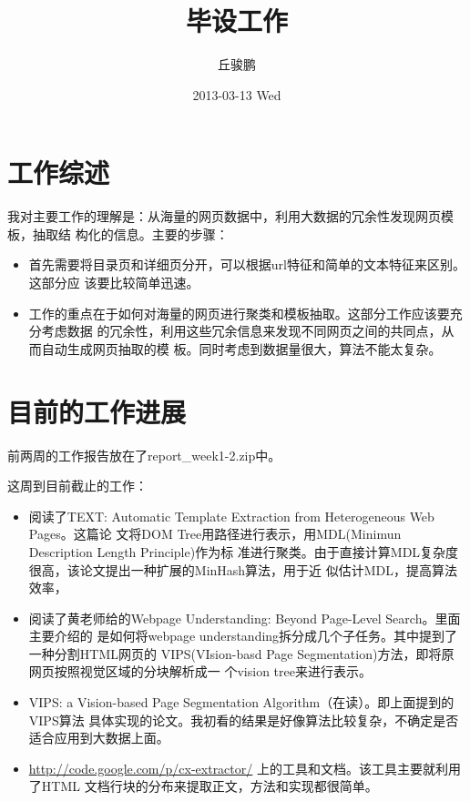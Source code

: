 \documentclass[a4paper]{article}
\title{毕设工作}
\author{丘骏鹏}
\date{2013-03-13 Wed}
\begin{document}
\maketitle



\section{工作综述}
\label{sec-1}

我对主要工作的理解是：从海量的网页数据中，利用大数据的冗余性发现网页模板，抽取结
构化的信息。主要的步骤：
\begin{itemize}
\item 首先需要将目录页和详细页分开，可以根据url特征和简单的文本特征来区别。这部分应
  该要比较简单迅速。
\item 工作的重点在于如何对海量的网页进行聚类和模板抽取。这部分工作应该要充分考虑数据
  的冗余性，利用这些冗余信息来发现不同网页之间的共同点，从而自动生成网页抽取的模
  板。同时考虑到数据量很大，算法不能太复杂。
\end{itemize}
\section{目前的工作进展}
\label{sec-2}

前两周的工作报告放在了report\_{}week1-2.zip中。

这周到目前截止的工作：
\begin{itemize}
\item 阅读了TEXT: Automatic Template Extraction from Heterogeneous Web Pages。这篇论
  文将DOM Tree用路径进行表示，用MDL(Minimun Description Length Principle)作为标
  准进行聚类。由于直接计算MDL复杂度很高，该论文提出一种扩展的MinHash算法，用于近
  似估计MDL，提高算法效率，
\item 阅读了黄老师给的Webpage Understanding: Beyond Page-Level Search。里面主要介绍的
  是如何将webpage understanding拆分成几个子任务。其中提到了一种分割HTML网页的
  VIPS(VIsion-basd Page Segmentation)方法，即将原网页按照视觉区域的分块解析成一
  个vision tree来进行表示。
\item VIPS: a Vision-based Page Segmentation Algorithm（在读）。即上面提到的VIPS算法
  具体实现的论文。我初看的结果是好像算法比较复杂，不确定是否适合应用到大数据上面。
\item \href{http://code.google.com/p/cx-extractor/}{http://code.google.com/p/cx-extractor/} 上的工具和文档。该工具主要就利用了HTML
  文档行块的分布来提取正文，方法和实现都很简单。
\end{itemize}
\end{document}
